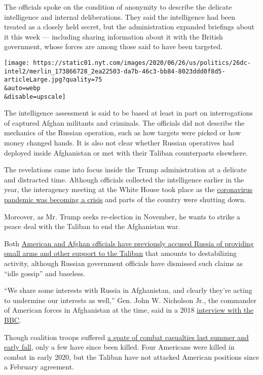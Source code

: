 The officials spoke on the condition of anonymity to describe the
delicate intelligence and internal deliberations. They said the
intelligence had been treated as a closely held secret, but the
administration expanded briefings about it this week --- including
sharing information about it with the British government, whose forces
are among those said to have been targeted.

\texttt{[image: https://static01.nyt.com/images/2020/06/26/us/politics/26dc-intel2/merlin\_173866728\_2ea22503-da7b-46c3-bb84-8023ddd0f8d5-articleLarge.jpg?quality=75\\\&auto=webp\\\&disable=upscale]}

The intelligence assessment is said to be based at least in part on
interrogations of captured Afghan militants and criminals. The officials
did not describe the mechanics of the Russian operation, such as how
targets were picked or how money changed hands. It is also not clear
whether Russian operatives had deployed inside Afghanistan or met with
their Taliban counterparts elsewhere.

The revelations came into focus inside the Trump administration at a
delicate and distracted time. Although officials collected the
intelligence earlier in the year, the interagency meeting at the White
House took place as the
\href{https://www.nytimes.com/interactive/2020/us/coronavirus-us-cases.html}{coronavirus
pandemic was becoming a crisis} and parts of the country were shutting
down.

Moreover, as Mr. Trump seeks re-election in November, he wants to strike
a peace deal with the Taliban to end the Afghanistan war.

Both
\href{https://www.npr.org/sections/thetwo-way/2018/03/26/596933077/top-u-s-commander-in-afghanistan-accuses-russia-of-aiding-taliban}{American
and Afghan officials have previously accused Russia of providing small
arms and other support to the Taliban} that amounts to destabilizing
activity, although Russian government officials have dismissed such
claims as ``idle gossip'' and baseless.

``We share some interests with Russia in Afghanistan, and clearly
they're acting to undermine our interests as well,'' Gen. John W.
Nicholson Jr., the commander of American forces in Afghanistan at the
time, said in a 2018
\href{https://www.bbc.com/news/world-asia-43500299}{interview with the
BBC}.

Though coalition troops suffered
\href{http://icasualties.org/App/AfghanFatalities?page=1\&rows=100}{a
spate of combat casualties last summer and early fall}, only a few have
since been killed. Four Americans were killed in combat in early 2020,
but the Taliban have not attacked American positions since a February
agreement.


